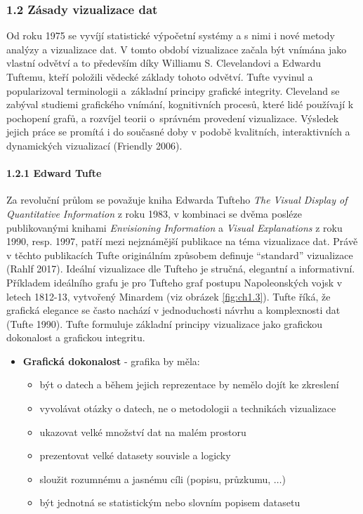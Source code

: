 \documentclass[12pt,]{article}
\providecommand{\tightlist}{%
  \setlength{\itemsep}{0pt}\setlength{\parskip}{0pt}}
\let\oldparagraph\paragraph
\renewcommand{\paragraph}[1]{\oldparagraph{#1}\mbox{}}
\begin{document}
\subsubsection{1.2 Zásady vizualizace dat}\label{zasady-vizualizace-dat}

\qquad Od roku 1975 se vyvíjí statistické výpočetní systémy a s nimi i
nové metody analýzy a vizualizace dat. V tomto období vizualizace začala
být vnímána jako vlastní odvětví a to především díky Williamu S.
Clevelandovi a Edwardu Tuftemu, kteří položili vědecké základy tohoto
odvětví. Tufte vyvinul a popularizoval terminologii a~základní principy
grafické integrity. Cleveland se zabýval studiemi grafického vnímání,
kognitivních procesů, které lidé používají k pochopení grafů, a rozvíjel
teorii o~správném provedení vizualizace. Výsledek jejich práce se
promítá i do současné doby v podobě kvalitních, interaktivních a
dynamických vizualizací (Friendly 2006).

\hypertarget{tufte}{\paragraph{1.2.1 Edward Tufte}\label{tufte}}

\qquad Za revoluční průlom se považuje kniha Edwarda Tufteho \emph{The
Visual Display of Quantitative Information} z roku 1983, v kombinaci se
dvěma posléze publikovanými knihami \emph{Envisioning Information} a
\emph{Visual Explanations} z roku 1990, resp. 1997, patří mezi
nejznámější publikace na téma vizualizace dat. Právě v těchto
publikacích Tufte originálním způsobem definuje \enquote{standard}
vizualizace (Rahlf 2017). Ideální vizualizace dle Tufteho je stručná,
elegantní a informativní. Příkladem ideálního grafu je pro Tufteho graf
postupu Napoleonských vojsk v letech 1812-13, vytvořený Minardem (viz
obrázek \ref{fig:ch1.3}). Tufte říká, že grafická elegance se často
nachází v jednoduchosti návrhu a komplexnosti dat (Tufte 1990). Tufte
formuluje základní principy vizualizace jako grafickou dokonalost a
grafickou integritu.

\begin{itemize}
\tightlist
\item
  \textbf{Grafická dokonalost} - grafika by měla:

  \begin{itemize}
  \tightlist
  \item
    být o datech a během jejich reprezentace by nemělo dojít ke
    zkreslení
  \item
    vyvolávat otázky o datech, ne o metodologii a technikách vizualizace
  \item
    ukazovat velké množství dat na malém prostoru
  \item
    prezentovat velké datasety souvisle a logicky
  \item
    sloužit rozumnému a jasnému cíli (popisu, průzkumu, \(\dots\))
  \item
    být jednotná se statistickým nebo slovním popisem datasetu
  \end{itemize}
\end{itemize}
\end{document}
